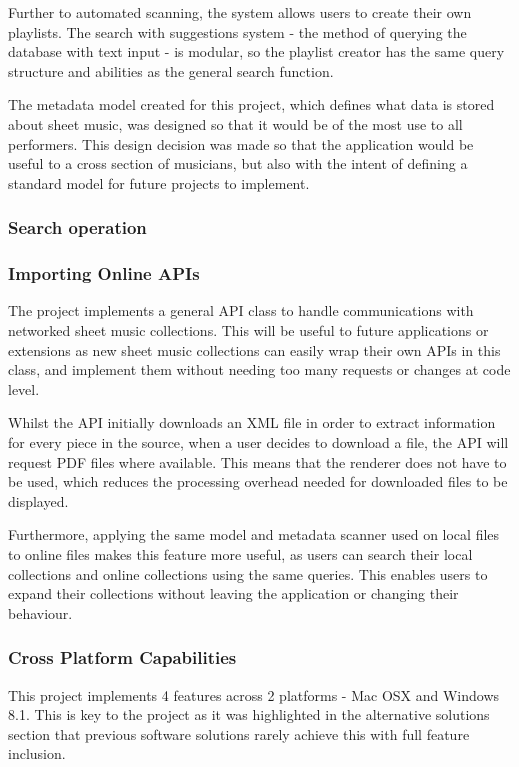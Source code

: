 Further to automated scanning, the system allows users to create their own playlists. The search with suggestions system - the method of querying the database with text input - is modular, so the playlist creator has the same query structure and abilities as the general search function.

The metadata model created for this project, which defines what data is stored about sheet music, was designed so that it would be of the most use to all performers. This design decision was made so that the application would be useful to a cross section of musicians, but also with the intent of defining a standard model for future projects to implement.

\subsubsection{Search operation}


\subsubsection{Importing Online APIs}
The project implements a general API class to handle communications with networked sheet music collections. This will be useful to future applications or extensions as new sheet music collections can easily wrap their own APIs in this class, and implement them without needing too many requests or changes at code level.

Whilst the API initially downloads an XML file in order to extract information for every piece in the source, when a user decides to download a file, the API will request PDF files where available. This means that the renderer does not have to be used, which reduces the processing overhead needed for downloaded files to be displayed.

Furthermore, applying the same model and metadata scanner used on local files to online files makes this feature more useful, as users can search their local collections and online collections using the same queries. This enables users to expand their collections without leaving the application or changing their behaviour.

\subsubsection{Cross Platform Capabilities}
This project implements 4 features across 2 platforms - Mac OSX and Windows 8.1. This is key to the project as it was highlighted in the alternative solutions section that previous software solutions rarely achieve this with full feature inclusion. 

